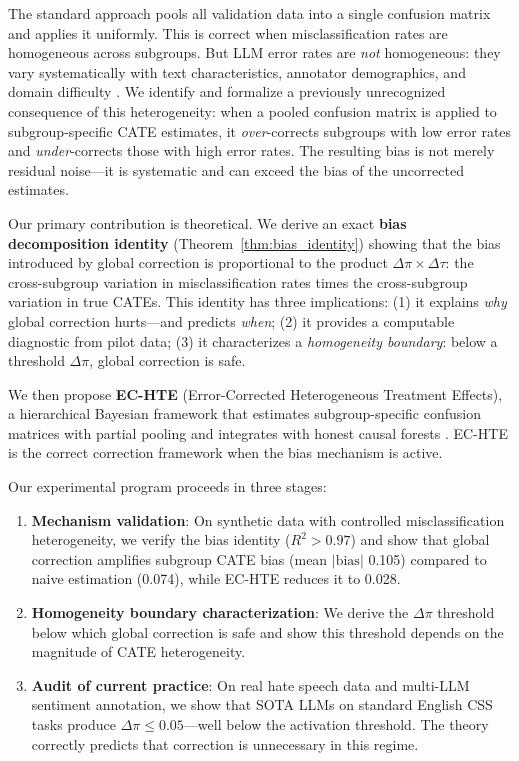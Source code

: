 \documentclass[11pt,a4paper]{article}
\begin{document}
The standard approach pools all validation data into a single confusion matrix and applies it uniformly.
This is correct when misclassification rates are homogeneous across subgroups.
But LLM error rates are \emph{not} homogeneous: they vary systematically with text characteristics, annotator demographics, and domain difficulty \cite{ashwin2025using}.
We identify and formalize a previously unrecognized consequence of this heterogeneity: when a pooled confusion matrix is applied to subgroup-specific CATE estimates, it \emph{over}-corrects subgroups with low error rates and \emph{under}-corrects those with high error rates.
The resulting bias is not merely residual noise---it is systematic and can exceed the bias of the uncorrected estimates.

Our primary contribution is theoretical.
We derive an exact \textbf{bias decomposition identity} (Theorem~\ref{thm:bias_identity}) showing that the bias introduced by global correction is proportional to the product $\Delta\pi \times \Delta\tau$: the cross-subgroup variation in misclassification rates times the cross-subgroup variation in true CATEs.
This identity has three implications:
(1) it explains \emph{why} global correction hurts---and predicts \emph{when};
(2) it provides a computable diagnostic from pilot data;
(3) it characterizes a \emph{homogeneity boundary}: below a threshold $\Delta\pi$, global correction is safe.

We then propose \textbf{EC-HTE} (Error-Corrected Heterogeneous Treatment Effects), a hierarchical Bayesian framework that estimates subgroup-specific confusion matrices with partial pooling and integrates with honest causal forests \cite{wager2018estimation}.
EC-HTE is the correct correction framework when the bias mechanism is active.

Our experimental program proceeds in three stages:
\begin{enumerate}
    \item \textbf{Mechanism validation}: On synthetic data with controlled misclassification heterogeneity, we verify the bias identity ($R^2 > 0.97$) and show that global correction amplifies subgroup CATE bias (mean $|\text{bias}|$ 0.105) compared to naive estimation (0.074), while EC-HTE reduces it to 0.028.
    \item \textbf{Homogeneity boundary characterization}: We derive the $\Delta\pi$ threshold below which global correction is safe and show this threshold depends on the magnitude of CATE heterogeneity.
    \item \textbf{Audit of current practice}: On real hate speech data and multi-LLM sentiment annotation, we show that SOTA LLMs on standard English CSS tasks produce $\Delta\pi \leq 0.05$---well below the activation threshold. The theory correctly predicts that correction is unnecessary in this regime.
\end{enumerate}
\end{document}
